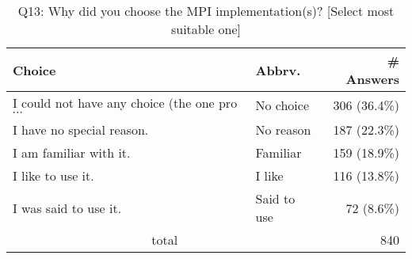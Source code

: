 \begin{table}[htb]%
\begin{center}%
\caption{Q13: Why did you choose the MPI implementation(s)? [Select most suitable one]}%
\label{tab:Q13-ans}%
\begin{tabular}{l|l|r}%
\hline%
Choice & Abbrv. & \# Answers \\%
\hline%
{\small I could not have any choice (the one pro$\cdots$} & No choice & 306 (36.4\%) \\%
I have no special reason. & No reason & 187 (22.3\%) \\%
I am familiar with it. & Familiar & 159 (18.9\%) \\%
I like to use it. & I like & 116 (13.8\%) \\%
I was said to use it. & Said to use & 72 (8.6\%) \\%
\hline%
\multicolumn{2}{c}{total} & 840 \\%
\hline%
\end{tabular}%
\end{center}%
\end{table}%
